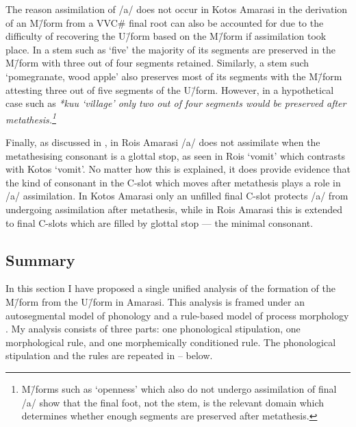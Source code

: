 The reason assimilation of /a/ does not
occur in Kotos Amarasi in the derivation of
an M\=/form from a VVC{\#} final root can also be accounted
for due to the difficulty of recovering
the U\=/form based on the M\=/form if assimilation took place.
In a stem such as  {\ra}  `five'
the majority of its segments are preserved in the M\=/form
with three out of four segments retained.
Similarly, a stem such  {\ra}  `pomegranate, wood apple'
also preserves most of its segments with the M\=/form
attesting three out of five segments of the U\=/form.
However, in a hypothetical case such as  {\ra} \it{*kuu} `village'
only two out of four segments would be preserved after metathesis.\footnote{
		M\=/forms such as  {\ra}  `openness' which
		also do not undergo assimilation of final /a/
		show that the final foot, not the stem, is the relevant domain
		which determines whether enough segments are preserved after metathesis.}

Finally, as discussed in , in Ro{\Q}is Amarasi
/a/ does not assimilate when the metathesising consonant is a glottal stop,
as seen in Ro{\Q}is  {\ra}  `vomit'
which contrasts with Kotos  {\ra}  `vomit'.
No matter how this is explained, it does provide evidence that
the kind of consonant in the C-slot which moves after
metathesis plays a role in /a/ assimilation.
In Kotos Amarasi only an unfilled final C-slot protects
/a/ from undergoing assimilation after metathesis,
while in Ro{\Q}is Amarasi this is extended to final
C-slots which are filled by glottal stop --- the minimal consonant.

\subsection{Summary}
In this section I have proposed a single unified
analysis of the formation of the M\=/form
from the U\=/form in Amarasi.
This analysis is framed under an autosegmental model of phonology \citep{go76}
and a rule-based model of process morphology \citep{ma74,an92}.
My analysis consists of three parts:
one phonological stipulation, one morphological rule,
and one morphemically conditioned rule.
The phonological stipulation and the rules
are repeated in -- below.

\begin{exe}
	\label{ex3:Ft->CVCVC}
	\label{ex2:CV->VC/'V-}
	\label{ex2:'VaC->VC}
\end{exe}

